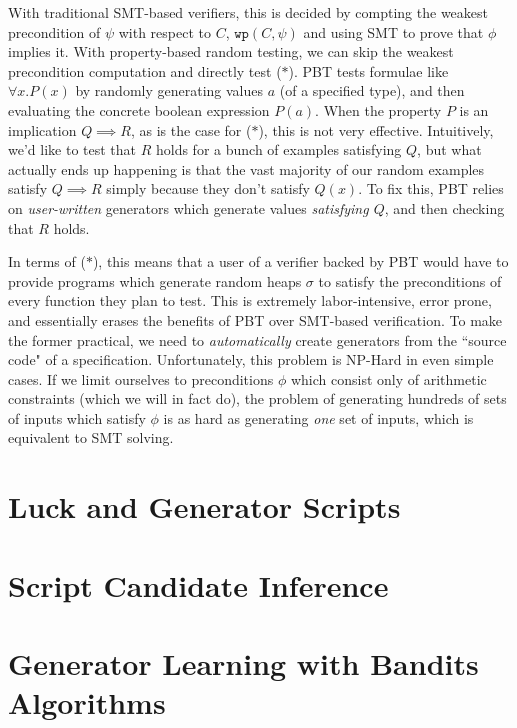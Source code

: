 \documentclass[10pt,a4paper]{article}
\begin{document}
With traditional SMT-based verifiers, this is decided by compting the weakest precondition of $\psi$ with respect to $C$, $\texttt{wp}(C,\psi)$ and using SMT to prove that $\phi$ implies it. With property-based random testing, we can skip the weakest precondition computation and directly test ($\ast$). PBT tests formulae like $\forall x. P(x)$ by randomly generating values $a$ (of a specified type), and then evaluating the concrete boolean expression $P(a)$. When the property $P$ is an implication $Q \implies R$, as is the case for ($\ast$), this is not very effective. Intuitively, we'd like to test that $R$ holds for a bunch of examples satisfying $Q$, but what actually ends up happening is that the vast majority of our random examples satisfy $Q \implies R$ simply because they don't satisfy $Q(x)$. To fix this, PBT relies on \textit{user-written} generators which generate values \textit{satisfying $Q$}, and then checking that $R$ holds.

In terms of ($\ast$), this means that a user of a verifier backed by PBT would have to provide programs which generate random heaps $\sigma$ to satisfy the preconditions of every function they plan to test. This is extremely labor-intensive, error prone, and essentially erases the benefits of PBT over SMT-based verification. To make the former practical, we need to \textit{automatically} create generators from the ``source code" of a specification. Unfortunately, this problem is NP-Hard in even simple cases. If we limit ourselves to preconditions $\phi$ which consist only of arithmetic constraints (which we will in fact do), the problem of generating hundreds of sets of inputs which satisfy $\phi$ is as hard as generating \textit{one} set of inputs, which is equivalent to SMT solving.

\section{Luck and Generator Scripts}
\label{sec:luck}

\section{Script Candidate Inference}
\label{sec:sci}

\section{Generator Learning with Bandits Algorithms}
\label{sec:bandits}
\end{document}
